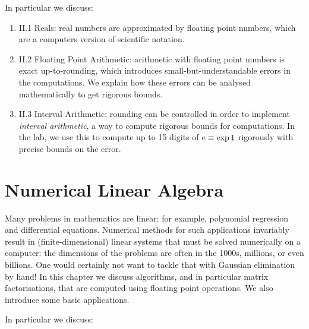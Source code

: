 \documentclass[12pt,a4paper]{book}
\theoremstyle{definition}
\begin{document}
In particular we discuss:

\begin{enumerate}
\item II.1 Reals:  real numbers are approximated by floating point numbers, which are a computers version of scientific notation.
\item II.2 Floating Point Arithmetic:  arithmetic with floating point numbers is exact up-to-rounding, which introduces small-but-understandable errors in the computations. We explain how these errors can be analysed mathematically to get rigorous bounds. 
\item II.3 Interval Arithmetic: rounding can be controlled in order to implement {\it interval arithmetic}, a way to compute rigorous bounds for computations. In the lab, we use this to compute up to 15 digits of ${\rm e} \equiv \exp 1$ rigorously with precise bounds on the error.
\end{enumerate}







\chapter{Numerical Linear Algebra}

Many problems in mathematics are linear: for example, polynomial regression and
differential equations. Numerical methods for such applications invariably result
in (finite-dimensional) linear systems that must be solved numerically on a computer: 
the dimensions of the problems are often in the 1000s, millions, or even billions.
One would certainly not want to tackle that with Gaussian elimination by hand!
In this chapter we discuss algorithms, and in particular matrix factorisations, that are
computed using floating point operations. We also introduce some basic applications.



In particular we discuss:
\end{document}
